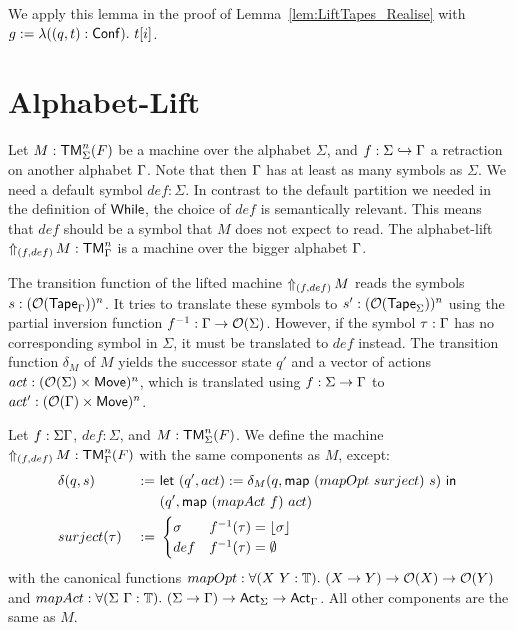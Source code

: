 We apply this lemma in the proof of Lemma~\ref{lem:LiftTapes_Realise} with $g := \lambda ((q,t):\Conf).~t[i]$.



\section{Alphabet-Lift}
\label{sec:sigma-Lift}

Let $M : \TM_\Sigma^n(F)$ be a machine over the alphabet $\Sigma$, and $f : \Sigma \hookrightarrow \Tau$ a retraction on another alphabet $\Tau$.
Note that then $\Tau$ has at least as many symbols as $\Sigma$.  We need a default symbol $def:\Sigma$.  In contrast to the default partition we
needed in the definition of $\While$, the choice of $def$ is semantically relevant.  This means that $def$ should be a symbol that $M$ does not expect
to read.  The alphabet-lift $\LiftAlphabet{M}{(f,def)} : \TM_\Tau^n$ is a machine over the bigger alphabet $\Tau$.

The transition function of the lifted machine $\LiftAlphabet{M}{(f,def)}$ reads the symbols \\$s :
(\Option(\Tape_\Tau))^n$.  It tries to translate these symbols to $s':(\Option(\Tape_\Sigma))^n$ using the partial inversion function $f^{-1} : \Tau
\to \Option(\Sigma)$.  However, if the symbol $\tau:\Tau$ has no corresponding symbol in $\Sigma$, it must be translated to
$def$ instead.  The transition function $\delta_M$ of $M$ yields the successor state $q'$ and a vector of actions $act: (\Option(\Sigma) \times
\MS{Move})^n$, which is translated using $f:\Sigma\to\Tau$ to $act' : (\Option(\Tau) \times \MS{Move})^n$.

\begin{definition}
  \label{def:LiftAlphabet}
  Let $f : \Sigma \Tau$, $def:\Sigma$, and $M : \TM_\Sigma^n(F)$.  We define the machine %
  $\LiftAlphabet{M}{(f,def)} : \TM_\Tau^n(F)$ with the same components as $M$, except:
  \begin{alignat*}{2}
    &\delta(q,s)    &~:=~& \Let{(q', act) := \delta_M(q, \map{(mapOpt~surject)}{s})}{\\%
    &               &~  ~& (q', \map{(mapAct~f)}{act})} \\
    & surject(\tau) &~:=~&
    \begin{cases}
      \sigma & f^{-1}(\tau) = \Some{\sigma} \\
      def & f^{-1}(\tau) = \None
    \end{cases}
  \end{alignat*}
  with the canonical functions $mapOpt: \forall (X~Y:\Type).~ (X \to Y) \to \Option(X) \to \Option(Y)$ and
  $mapAct : \forall (\Sigma~\Tau:\Type).~(\Sigma\to\Tau) \to \Act_\Sigma \to \Act_\Tau$.  All other components are the same as $M$.
\end{definition}

